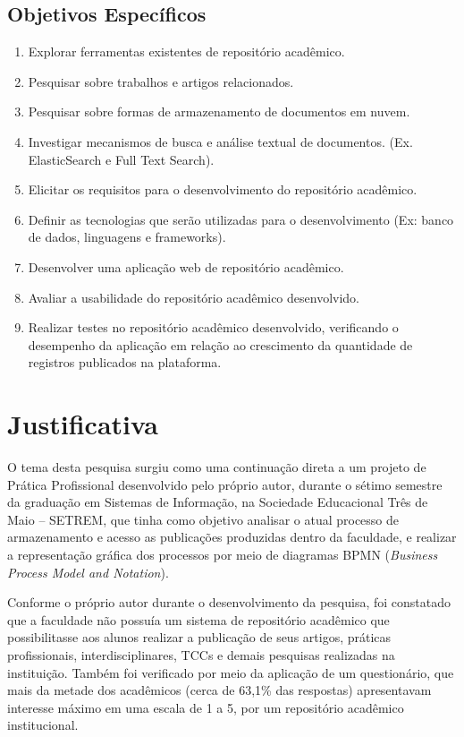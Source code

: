 \subsection{Objetivos Específicos}
\begin{enumerate}
    \item Explorar ferramentas existentes de repositório acadêmico.
    \item Pesquisar sobre trabalhos e artigos relacionados.
    \item Pesquisar sobre formas de armazenamento de documentos em nuvem.
    \item Investigar mecanismos de busca e análise textual de documentos. (Ex. ElasticSearch e Full Text Search).
    \item Elicitar os requisitos para o desenvolvimento do repositório acadêmico.
    \item Definir as tecnologias que serão utilizadas para o desenvolvimento (Ex: banco de dados, linguagens e frameworks).
    \item Desenvolver uma aplicação web de repositório acadêmico.
    \item Avaliar a usabilidade do repositório acadêmico desenvolvido.
    \item Realizar testes no repositório acadêmico desenvolvido, verificando o desempenho da aplicação em relação ao crescimento da quantidade de registros publicados na plataforma.

\end{enumerate}


\section{Justificativa}\label{sec:justification}

O tema desta pesquisa surgiu como uma continuação direta a um projeto
de Prática Profissional desenvolvido pelo próprio autor, durante o sétimo
semestre da graduação em Sistemas de Informação, na Sociedade Educacional
Três de Maio – SETREM, que tinha como objetivo analisar o atual processo
de armazenamento e acesso as publicações produzidas dentro da faculdade,
e realizar a representação gráfica dos processos por meio de diagramas BPMN
(\emph{Business Process Model and Notation}).

Conforme o próprio autor durante o desenvolvimento da pesquisa, foi constatado que a faculdade
não possuía um sistema de repositório acadêmico que possibilitasse aos
alunos realizar a publicação de seus artigos, práticas profissionais,
interdisciplinares, TCCs e demais pesquisas realizadas na instituição.
Também foi verificado por meio da aplicação de um questionário, que
mais da metade dos acadêmicos (cerca de 63,1\% das respostas) apresentavam
interesse máximo em uma escala de 1 a 5, por um repositório acadêmico
institucional.


